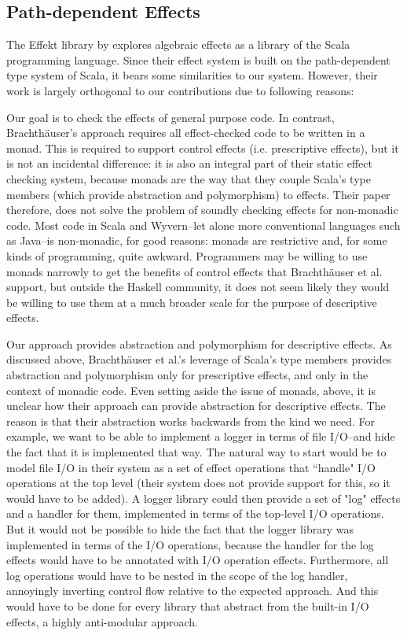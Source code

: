 \subsection{Path-dependent Effects}
The Effekt library by \citet{brachthauser20} explores algebraic effects as a library of the Scala programming language. Since their effect system is built on the path-dependent type system of Scala, it bears some similarities to our system. However, their work is largely orthogonal to our contributions due to following reasons: 

	 Our goal is to check the effects of general purpose code. In contrast, Brachthäuser's approach requires all effect-checked code to be written in a monad. This is required to support control effects (i.e. prescriptive effects), but it is not an incidental difference: it is also an integral part of their static effect checking system, because monads are the way that they couple Scala's type members (which provide abstraction and polymorphism) to effects. Their paper therefore, does not solve the problem of soundly checking effects for non-monadic code. Most code in Scala and Wyvern--let alone more conventional languages such as Java--is non-monadic, for good reasons: monads are restrictive and, for some kinds of programming, quite awkward. Programmers may be willing to use monads narrowly to get the benefits of control effects that Brachthäuser et al. support, but outside the Haskell community, it does not seem likely they would be willing to use them at a much broader scale for the purpose of descriptive effects.
	 
   Our approach provides abstraction and polymorphism for descriptive effects. As discussed above, Brachthäuser et al.'s leverage of Scala's type members provides abstraction and polymorphism only for prescriptive effects, and only in the context of monadic code. Even setting aside the issue of monads, above, it is unclear how their approach can provide abstraction for descriptive effects. The reason is that their abstraction works backwards from the kind we need. For example, we want to be able to implement a logger in terms of file I/O--and hide the fact that it is implemented that way. The natural way to start would be to model file I/O in their system as a set of effect operations that ``handle" I/O operations at the top level (their system does not provide support for this, so it would have to be added). A logger library could then provide a set of "log" effects and a handler for them, implemented in terms of the top-level I/O operations. But it would not be possible to hide the fact that the logger library was implemented in terms of the I/O operations, because the handler for the log effects would have to be annotated with I/O operation effects. Furthermore, all log operations would have to be nested in the scope of the log handler, annoyingly inverting control flow relative to the expected approach. And this would have to be done for every library that abstract from the built-in I/O effects, a highly anti-modular approach.
	



